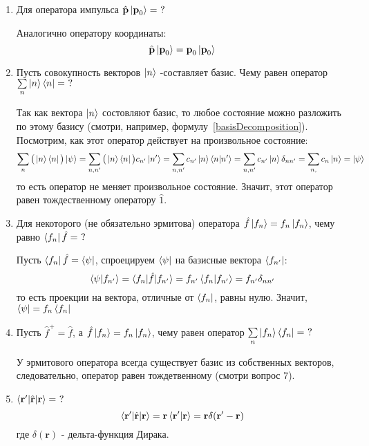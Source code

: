 \documentclass{article}
\begin{document}
\begin{enumerate}
	\item {Для оператора импульса  $\hat{\textbf{p} } \ket{\textbf{p}_0} = \ ?$}
	
	Аналогично оператору координаты:
	\begin{equation}
		\hat{\textbf{p}}\ket{\textbf{p}_0} = \textbf{p}_0 \ket{\textbf{p}_0}
	\end{equation}
	
	\item {Пусть совокупность векторов $\ket{n}$ -составляет базис. Чему равен оператор $\sum\limits_n \ket{n}\bra{n} = \ ?$}
	
	Так как вектора $\ket{n}$ состовляют базис, то любое состояние можно разложить по этому базису (смотри, например, формулу~\eqref{basisDecomposition}). Посмотрим, как этот оператор действует на произвольное состояние:
	\begin{equation}
		\sum\limits_n \big(\ket{n}\bra{n}\big) \ket{\psi} = \sum\limits_{n, n'} \big(\ket{n}\bra{n}\big) c_{n'}\ket{n'} = \sum\limits_{n, n'} c_{n'}\ket{n}\braket{n|n'} = \sum\limits_{n, n'} c_{n'}\ket{n}\delta_{nn'} = \sum\limits_{n,} c_{n}\ket{n} = \ket{\psi}
	\end{equation}
	то есть оператор не меняет произвольное состояние. Значит, этот оператор равен тождественному оператору $\hat{1}$.
	
	\item {Для некоторого (не обязательно эрмитова) оператора $\hat{f}\ket{f_n} = f_n\ket{f_n}$, чему равно $\bra{f_n}\hat{f} = \ ?$}
	
	Пусть $\bra{f_n}\hat{f} = \bra{\psi}$, спроецируем $\bra{\psi}$ на базисные вектора $\bra{f_{n'}}$:
	\begin{equation}
		\braket{\psi|f_{n'}} = \braket{f_n|\hat{f}|f_{n'}} = f_{n'} \braket{f_n|f_{n'}} = f_{n'} \delta_{nn'}
	\end{equation}
	то есть проекции на вектора, отличные от $\bra{f_n}$, равны нулю. Значит, $\bra{\psi} = f_n\bra{f_n}$
	
	\item {Пусть $\hat{f}^+=\hat{f}$, а $\hat{f}\ket{f_n} = f_n \ket{f_n}$, чему равен оператор $\sum\limits_n \ket{f_n}\bra{f_n} = \ ?$}
	
	У эрмитового оператора всегда существует базис из собственных векторов, следовательно, оператор равен тождетвенному (смотри вопрос 7).
	
	\item $\braket{\textbf{r}'|\hat{\textbf{r}}|\textbf{r}} = \ ?$
	\begin{equation}
		\braket{\textbf{r}'|\hat{\textbf{r}}|\textbf{r}} = \textbf{r} \braket{\textbf{r}'|\textbf{r}} =\textbf{r} \delta(\textbf{r}' - \textbf{r})
	\end{equation}
	где $\delta(\textbf{r})$ - дельта-функция Дирака.
	

\end{enumerate}
\end{document}

